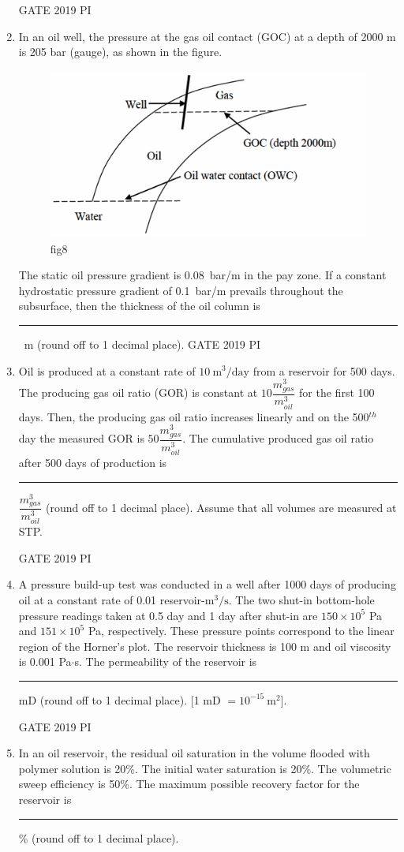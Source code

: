 \documentclass[journal,12pt,onecolumn]{IEEEtran}
\theoremstyle{remark}
\begin{document}
\begin{enumerate}
\hfill{GATE 2019 PI}

\item In an oil well, the pressure at the gas oil contact (GOC) at a depth of 2000 m is 205 bar (gauge), as shown in the figure.
\begin{figure}[H]
    \centering
    \includegraphics[width=0.5\linewidth]{figs/Q.41.png}
    \caption{fig8}
    \label{fig:figs/Q.41.png}
\end{figure}
The static oil pressure gradient is 0.08~bar/m in the pay zone. If a constant hydrostatic pressure gradient of 0.1~bar/m prevails throughout the subsurface, then the thickness of the oil column is \rule{2cm}{0.15mm}~m (round off to 1 decimal place).
\hfill{GATE 2019 PI}
\item Oil is produced at a constant rate of $10 \ \mathrm{m^3/day}$ from a reservoir for 500 days. The producing gas oil ratio (GOR) is constant at $10 \dfrac{m^3_{gas}}{m^3_{oil}}$ for the first 100 days. Then, the producing gas oil ratio increases linearly and on the 500$^{th}$ day the measured GOR is $50 \dfrac{m^3_{gas}}{m^3_{oil}}$. The cumulative produced gas oil ratio after 500 days of production is \rule{2cm}{0.15mm} $\dfrac{m^3_{gas}}{m^3_{oil}}$ (round off to 1 decimal place). Assume that all volumes are measured at STP.

\hfill{GATE 2019 PI}

\item A pressure build-up test was conducted in a well after 1000 days of producing oil at a constant rate of 0.01 reservoir-$\mathrm{m^3/s}$. The two shut-in bottom-hole pressure readings taken at 0.5 day and 1 day after shut-in are $150 \times 10^5$ Pa and $151 \times 10^5$ Pa, respectively. These pressure points correspond to the linear region of the Horner's plot. The reservoir thickness is 100 m and oil viscosity is 0.001 Pa$\cdot$s. The permeability of the reservoir is \rule{2cm}{0.15mm} mD (round off to 1 decimal place). [1 mD $= 10^{-15}~\mathrm{m^2}$].

\hfill{GATE 2019 PI}

\item In an oil reservoir, the residual oil saturation in the volume flooded with polymer solution is 20\%. The initial water saturation is 20\%. The volumetric sweep efficiency is 50\%. The maximum possible recovery factor for the reservoir is \rule{2cm}{0.15mm} \% (round off to 1 decimal place).


\end{enumerate}
\end{document}
